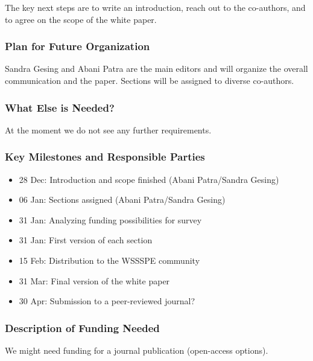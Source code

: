 The key next steps are to write an introduction, reach out to the co-authors,
and to agree on the scope of the white paper.

\subsubsection{Plan for Future Organization}

Sandra Gesing and Abani Patra are the main editors and will organize the overall
communication and the paper. Sections will be assigned to diverse co-authors.

\subsubsection{What Else is Needed?}

At the moment we do not see any further requirements.

\subsubsection{Key Milestones and Responsible Parties}
\begin{itemize}
\item 28 Dec: Introduction and scope finished (Abani Patra/Sandra Gesing)
\item 06 Jan: Sections assigned (Abani Patra/Sandra Gesing)
\item 31 Jan: Analyzing funding possibilities for survey
\item 31 Jan: First version of each section
\item 15 Feb: Distribution to the WSSSPE community
\item 31 Mar: Final version of the white paper
\item 30 Apr: Submission to a peer-reviewed journal?
\end{itemize}


\subsubsection{Description of Funding Needed}
We might need funding for a journal publication (open-access options).
